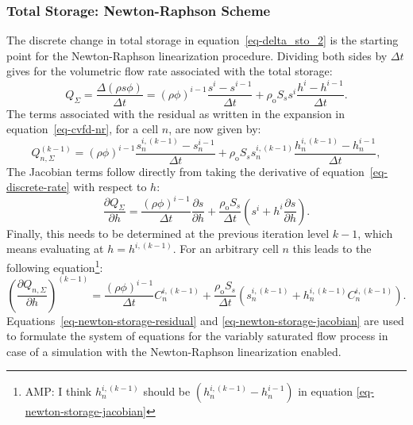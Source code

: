 \documentclass[fleqn]{article}
\begin{document}
\subsubsection*{Total Storage: Newton-Raphson Scheme}
The discrete change in total storage in equation~\ref{eq-delta_sto_2}
is the starting point for the Newton-Raphson linearization procedure. 
Dividing both sides by $\Delta t$ gives for the volumetric flow
rate associated with the total storage:
\begin{equation}
  Q_\Sigma = \frac{\Delta (\rho s \phi)}{\Delta t} = 
  (\rho \phi)^{i-1}\frac{s^i - s^{i-1}}{\Delta t} +
  \rho_{\textrm{o}} S_s s^i \frac{h^i - h^{i-1}}{\Delta t}.
  \label{eq-discrete-rate}
\end{equation}
The terms associated with the residual as written in the expansion
in equation~\ref{eq-cvfd-nr}, for a cell $n$, are now given by:
\begin{equation}
  Q_{n,\Sigma}^{(k-1)} =
  (\rho \phi)^{i-1}\frac{s_n^{i,(k-1)} - s_n^{i-1}}{\Delta t} +
  \rho_{\textrm{o}} S_s s_n^{i,(k-1)}
  \frac{h_n^{i,(k-1)} - h_n^{i-1}}{\Delta t},
  \label{eq-newton-storage-residual}
\end{equation}
The Jacobian terms follow directly from taking the derivative
of equation~\ref{eq-discrete-rate} with respect to $h$:
\begin{equation}
  \frac{\partial Q_{\Sigma}}{\partial h} =
  \frac{(\rho\phi)^{i-1}}{\Delta t}
  \frac{\partial s}{\partial h} +
  \frac{\rho_{\textrm{o}} S_s}{\Delta t}
  \left( s^i + h^i \frac{\partial s}{\partial h} \right).
\end{equation}
Finally, this needs to be determined at the previous iteration level
$k-1$, which means evaluating at $h = h^{i,(k-1)}$. For an arbitrary 
cell $n$ this leads to the following equation\footnote{AMP:
I think $h_n^{i,(k-1)}$ should be $\left ( h_n^{i,(k-1)} - h_n^{i-1} \right)$
in equation \ref{eq-newton-storage-jacobian}}:
\begin{equation}
  \left( \frac{\partial Q_{n,\Sigma}}{\partial h} \right)^{(k-1)} =
  \frac{(\rho\phi)^{i-1}}{\Delta t} C_n^{i,(k-1)} +
  \frac{\rho_{\textrm{o}} S_s}{\Delta t}
  \left( 
  s_n^{i,(k-1)} + h_n^{i,(k-1)} C_n^{i,(k-1)}
  \right).
  \label{eq-newton-storage-jacobian}
\end{equation}
Equations~\ref{eq-newton-storage-residual} and
\ref{eq-newton-storage-jacobian} are used to formulate the system of
equations for the variably saturated flow process in case of
a simulation with the Newton-Raphson linearization enabled.
\end{document}
